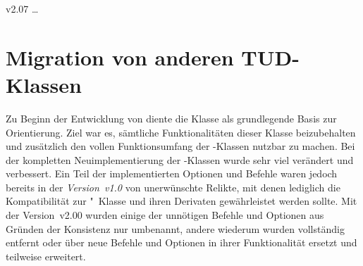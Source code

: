 \begin{Changes}{v2.07}
\dots
{}%
\end{Changes}


\section[%
  Das Paket \Package{tudscrcomp} -- Migration von anderen TUD-Klassen%
]{%
  Migration von anderen TUD-Klassen%
}
%
\begin{DeclareEntity}{}
\noindent{}

\bigskip\noindent
Zu Beginn der Entwicklung von \TUDScript diente die Klasse  als 
grundlegende Basis zur Orientierung. Ziel war es, sämtliche Funktionalitäten 
dieser Klasse beizubehalten und zusätzlich den vollen Funktionsumfang der 
\KOMAScript-Klassen nutzbar zu machen. Bei der kompletten Neuimplementierung 
der \TUDScript-Klassen wurde sehr viel verändert und verbessert. Ein Teil der 
implementierten Optionen und Befehle waren jedoch bereits in der 
\emph{Version~v1.0} von \TUDScript unerwünschte Relikte, mit denen lediglich 
die Kompatibilität zur "~Klasse und ihren Derivaten 
gewährleistet werden sollte. Mit der Version~v2.00 wurden einige der unnötigen 
Befehle und Optionen aus Gründen der Konsistenz nur umbenannt, andere wiederum 
wurden vollständig entfernt oder über neue Befehle und Optionen in ihrer 
Funktionalität ersetzt und teilweise erweitert. 


\end{DeclareEntity}
